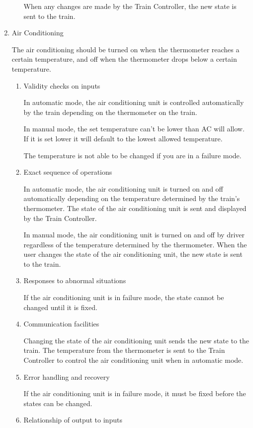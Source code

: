 \documentclass[11pt]{article}
\begin{document}
\begin{enumerate}
\begin{enumerate}
When any changes are made by the Train Controller, the new state is sent to the train.
\end{enumerate}
\item Air Conditioning
\label{sec-3-1-5-6}

The air conditioning should be turned on when the thermometer reaches a certain temperature, and off when the thermometer drops below a certain temperature.
\begin{enumerate}
\item Validity checks on inputs
\label{sec-3-1-5-6-1}

In automatic mode, the air conditioning unit is controlled automatically by the train depending on the thermometer on the train. 

In manual mode, the set temperature can't be lower than AC will allow. If it is set lower it will default to the lowest allowed temperature.

The temperature is not able to be changed if you are in a failure mode.
\item Exact sequence of operations
\label{sec-3-1-5-6-2}

In automatic mode, the air conditioning unit is turned on and off automatically depending on the temperature determined by the train's thermometer. The state of the air conditioning unit is sent and displayed by the Train Controller.  

In manual mode, the air conditioning unit is turned on and off by driver regardless of the temperature determined by the thermometer. When the user changes the state of the air conditioning unit, the new state is sent to the train.  
\item Responses to abnormal situations
\label{sec-3-1-5-6-3}

If the air conditioning unit is in failure mode, the state cannot be changed until it is fixed. 
\item Communication facilities
\label{sec-3-1-5-6-4}

Changing the state of the air conditioning unit sends the new state to the train. The temperature from the thermometer is sent to the Train Controller to control the air conditioning unit when in automatic mode. 
\item Error handling and recovery
\label{sec-3-1-5-6-5}

If the air conditioning unit is in failure mode, it must be fixed before the states can be changed. 
\item Relationship of output to inputs
\label{sec-3-1-5-6-6}


\end{enumerate}
\end{enumerate}
\end{document}
